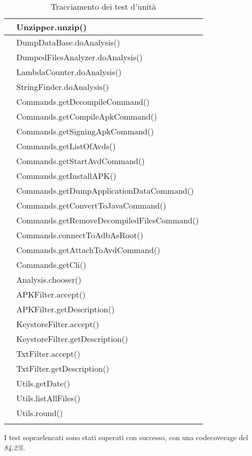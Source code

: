 \begin{center}
\begin{longtable}{ |C{3cm} |C{10.5cm}|}
         & Unzipper.unzip()                           \\\hline
         & DumpDataBase.doAnalysis()                  \\\hline
         & DumpedFilesAnalyzer.doAnalysis()           \\\hline
         & LambdaCounter.doAnalysis()                 \\\hline
         & StringFinder.doAnalysis()                  \\\hline
         & Commands.getDecompileCommand()             \\\hline
         & Commands.getCompileApkCommand()            \\\hline
         & Commands.getSigningApkCommand()            \\\hline
         & Commands.getListOfAvds()                   \\\hline
         & Commands.getStartAvdCommand()              \\\hline
         & Commands.getInstallAPK()                   \\\hline
         & Commands.getDumpApplicationDataCommand()   \\\hline
         & Commands.getConvertToJavaCommand()         \\\hline
         & Commands.getRemoveDecompiledFilesCommand() \\\hline
         & Commands.connectToAdbAsRoot()              \\\hline
         & Commands.getAttachToAvdCommand()           \\\hline
         & Commands.getCli()                          \\\hline
         & Analysis.chooser()                         \\\hline
         & APKFilter.accept()                         \\\hline
         & APKFilter.getDescription()                 \\\hline
         & KeystoreFilter.accept()                    \\\hline
         & KeystoreFilter.getDescription()            \\\hline
         & TxtFilter.accept()                         \\\hline
         & TxtFilter.getDescription()                 \\\hline
         & Utils.getDate()                            \\\hline
         & Utils.listAllFiles()                       \\\hline
         & Utils.round()                              \\\hline
        \caption{Tracciamento dei test d'unità}
    \end{longtable}
\end{center}

I test sopraelencati sono stati superati con successo, con una \gls{codecoverage} del \textit{84.2\%}.
\newpage